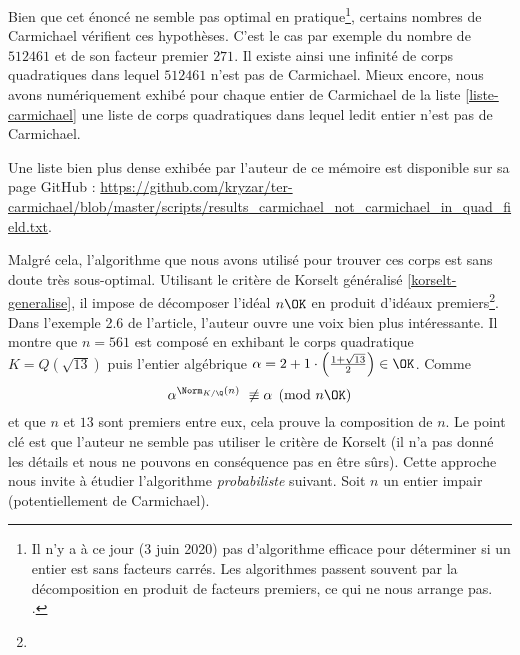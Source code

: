 Bien que cet énoncé ne semble pas optimal en pratique\footnote{Il n'y a à ce jour (3 juin 2020) pas d'algorithme efficace pour déterminer si un entier est sans facteurs carrés. Les algorithmes passent souvent par la décomposition en produit de facteurs premiers, ce qui ne nous arrange pas. .}, certains nombres de Carmichael vérifient ces hypothèses. C'est le cas par exemple du nombre de $512461$ et de son facteur premier $271$. Il existe ainsi une infinité de corps quadratiques dans lequel $512461$ n'est pas de Carmichael. Mieux encore, nous avons numériquement exhibé pour chaque entier de Carmichael de la liste \ref{liste-carmichael} une liste de corps quadratiques dans lequel ledit entier n'est pas de Carmichael.  \\

\begin{Complement}
	Une liste bien plus dense exhibée par l'auteur de ce mémoire est disponible sur sa page GitHub : \url{https://github.com/kryzar/ter-carmichael/blob/master/scripts/results_carmichael_not_carmichael_in_quad_field.txt}. \\
\end{Complement}

Malgré cela, l'algorithme que nous avons utilisé pour trouver ces corps est sans doute très sous-optimal. Utilisant le critère de Korselt généralisé \ref{korselt-generalise}, il impose de décomposer l'idéal $n\OK$ en produit d'idéaux premiers\footnote{}. Dans l'exemple 2.6 de l'article, l'auteur ouvre une voix bien plus intéressante. Il montre que $n = 561$ est composé en exhibant le corps quadratique $K = Q(\sqrt{13})$ puis l'entier algébrique $\alpha = 2 + 1\cdot \left(\frac{1 + \sqrt{13}}{2}\right) \in \OK$. Comme $$\alpha^{\Norm_{K/\Q}(n)} \not \equiv \alpha \pmod{n\OK}$$ et que $n$ et $13$ sont premiers entre eux, cela prouve la composition de $n$. Le point clé est que l'auteur ne semble pas utiliser le critère de Korselt (il n'a pas donné les détails et nous ne pouvons en conséquence pas en être sûrs). Cette approche nous invite à étudier l'algorithme \emph{probabiliste} suivant. Soit $n$ un entier impair (potentiellement de Carmichael).

\vspace{1em}
\begin{algorithm}[H]\label{algo-quadratique-faible}
\end{algorithm}
\vspace{1em}

